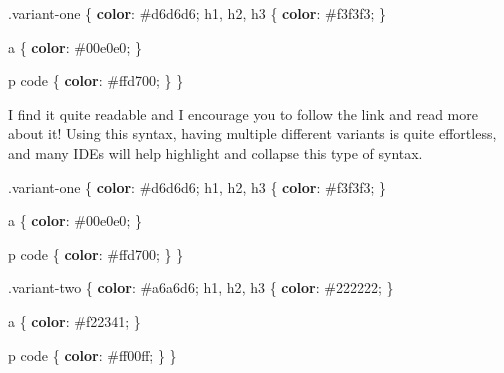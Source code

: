 \documentclass[
  letterpaper,
  DIV=11,
  numbers=noendperiod]{scrreprt}
\newenvironment{Shaded}{\begin{snugshade}}{\end{snugshade}}
\newcommand{\ConstantTok}[1]{\textcolor[rgb]{0.56,0.35,0.01}{#1}}
\newcommand{\FunctionTok}[1]{\textcolor[rgb]{0.28,0.35,0.67}{#1}}
\newcommand{\KeywordTok}[1]{\textcolor[rgb]{0.00,0.23,0.31}{\textbf{#1}}}
\newcommand{\NormalTok}[1]{\textcolor[rgb]{0.00,0.23,0.31}{#1}}
\newcommand{\OperatorTok}[1]{\textcolor[rgb]{0.37,0.37,0.37}{#1}}
\begin{document}
\begin{Shaded}
\begin{Highlighting}[]
\FunctionTok{.variant{-}one}\NormalTok{ \{}
  \KeywordTok{color}\NormalTok{: }\ConstantTok{\#d6d6d6}\OperatorTok{;}
\NormalTok{  h1}\OperatorTok{,}\NormalTok{ h2}\OperatorTok{,}\NormalTok{ h3 \{}
    \KeywordTok{color}\NormalTok{: }\ConstantTok{\#f3f3f3}\OperatorTok{;}
\NormalTok{  \}}

\NormalTok{  a \{}
    \KeywordTok{color}\NormalTok{: }\ConstantTok{\#00e0e0}\OperatorTok{;}
\NormalTok{  \}}

\NormalTok{  p code \{}
    \KeywordTok{color}\NormalTok{: }\ConstantTok{\#ffd700}\OperatorTok{;}
\NormalTok{  \}}
\NormalTok{\}}
\end{Highlighting}
\end{Shaded}

I find it quite readable and I encourage you to follow the link and read
more about it! Using this syntax, having multiple different variants is
quite effortless, and many IDEs will help highlight and collapse this
type of syntax.

\begin{Shaded}
\begin{Highlighting}[]
\FunctionTok{.variant{-}one}\NormalTok{ \{}
  \KeywordTok{color}\NormalTok{: }\ConstantTok{\#d6d6d6}\OperatorTok{;}
\NormalTok{  h1}\OperatorTok{,}\NormalTok{ h2}\OperatorTok{,}\NormalTok{ h3 \{}
    \KeywordTok{color}\NormalTok{: }\ConstantTok{\#f3f3f3}\OperatorTok{;}
\NormalTok{  \}}

\NormalTok{  a \{}
    \KeywordTok{color}\NormalTok{: }\ConstantTok{\#00e0e0}\OperatorTok{;}
\NormalTok{  \}}

\NormalTok{  p code \{}
    \KeywordTok{color}\NormalTok{: }\ConstantTok{\#ffd700}\OperatorTok{;}
\NormalTok{  \}}
\NormalTok{\}}

\FunctionTok{.variant{-}two}\NormalTok{ \{}
  \KeywordTok{color}\NormalTok{: }\ConstantTok{\#a6a6d6}\OperatorTok{;}
\NormalTok{  h1}\OperatorTok{,}\NormalTok{ h2}\OperatorTok{,}\NormalTok{ h3 \{}
    \KeywordTok{color}\NormalTok{: }\ConstantTok{\#222222}\OperatorTok{;}
\NormalTok{  \}}

\NormalTok{  a \{}
    \KeywordTok{color}\NormalTok{: }\ConstantTok{\#f22341}\OperatorTok{;}
\NormalTok{  \}}

\NormalTok{  p code \{}
    \KeywordTok{color}\NormalTok{: }\ConstantTok{\#ff00ff}\OperatorTok{;}
\NormalTok{  \}}
\NormalTok{\}}
\end{Highlighting}
\end{Shaded}
\end{document}
